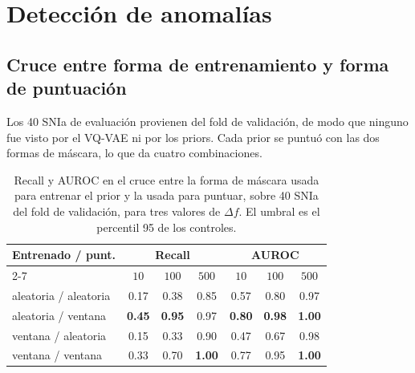 \section{Detección de anomalías}
\label{sec:res_deteccion}

\subsection{Cruce entre forma de entrenamiento y forma de puntuación}
\label{sec:res_mascaras}

Los 40 SNIa de evaluación provienen del fold de validación, de modo que ninguno fue visto por el VQ-VAE ni por los priors. Cada prior se puntuó con las dos formas de máscara, lo que da cuatro combinaciones.

\begin{table}[H]
\centering
\begin{tabular}{|l|c|c|c|c|c|c|}
\hline
\textbf{Entrenado / punt.} & \multicolumn{3}{c|}{\textbf{Recall}} & \multicolumn{3}{c|}{\textbf{AUROC}} \\
\cline{2-7}
 & $10$ & $100$ & $500$ & $10$ & $100$ & $500$ \\
\hline
aleatoria / aleatoria & 0.17 & 0.38 & 0.85 & 0.57 & 0.80 & 0.97 \\
aleatoria / ventana   & \textbf{0.45} & \textbf{0.95} & 0.97 & \textbf{0.80} & \textbf{0.98} & \textbf{1.00} \\
ventana / aleatoria   & 0.15 & 0.33 & 0.90 & 0.47 & 0.67 & 0.98 \\
ventana / ventana     & 0.33 & 0.70 & \textbf{1.00} & 0.77 & 0.95 & \textbf{1.00} \\
\hline
\end{tabular}
\caption{Recall y AUROC en el cruce entre la forma de máscara usada para entrenar el prior y la usada para puntuar, sobre 40 SNIa del fold de validación, para tres valores de $\Delta f$. El umbral es el percentil 95 de los controles.}
\label{tab:cruce_mascaras}
\end{table}

\begin{figure}[H]
\centering
{}
\end{figure}

